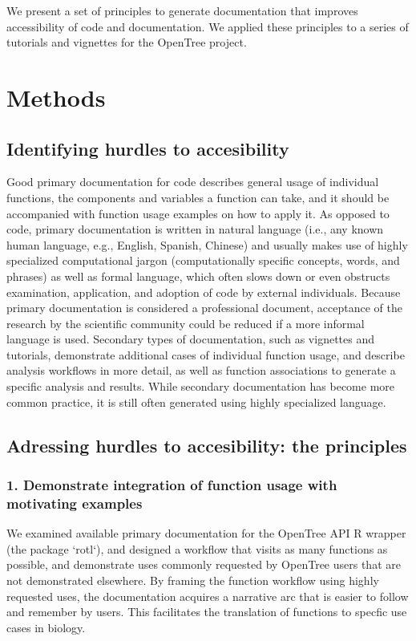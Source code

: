 \documentclass[12pt]{article}
\begin{document}
We present a set of principles to generate documentation that improves accessibility of code and documentation. We applied these principles to a series of tutorials and vignettes for the OpenTree project.

\section{Methods}
\label{sec:meth}
\subsection*{Identifying hurdles to accesibility}

Good primary documentation for code describes general usage of individual functions, the components and variables a function can take, and it should be accompanied with function usage examples on how to apply it.
As opposed to code, primary documentation is written in natural language (i.e., any known human language, e.g., English, Spanish, Chinese) and usually makes use of highly specialized computational jargon (computationally specific concepts, words, and phrases) as well as formal language, which often slows down or even obstructs examination, application, and adoption of code by external individuals.
Because primary documentation is considered a professional document, acceptance of the research by the scientific community could be reduced if a more informal language is used.
Secondary types of documentation, such as vignettes and tutorials, demonstrate additional cases of individual function usage, and describe analysis workflows in more detail, as well as function associations to generate a specific analysis and results. While secondary documentation has become more common practice, it is still often generated using highly specialized language.

\subsection*{Adressing hurdles to accesibility: the principles}

\subsubsection*{1. Demonstrate integration of function usage with motivating examples}

We examined available primary documentation for the OpenTree API R wrapper (the package `rotl`),
and designed a workflow that visits as many functions as possible, and demonstrate
uses commonly requested by OpenTree users that are not demonstrated elsewhere.
By framing the function workflow using highly requested uses, the documentation acquires a
narrative arc that is easier to follow and remember by users. This facilitates the translation
of functions to specfic use cases in biology.
\end{document}
